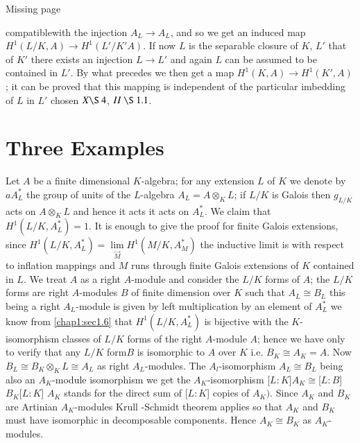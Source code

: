 \vfill

\centerline{\LARGE Missing page}\pageoriginale

\vfill


\noindent
compatible\pageoriginale with the injection $A_{L}
\rightarrow A_{L}$, and so we get an induced map $H^1 (L/K,A)
\rightarrow H^1 
(L'/K'A)$. If now $L$ is the separable closure of $K$, $L'$ that of $K'$
there  exists an  injection $L \rightarrow L'$ and again $L$ can be
assumed to be contained in $L'$. By what precedes we then get a map
$H^1 (K,A) \rightarrow H^1 (K', A)$; it can be proved that this mapping
is independent of the particular imbedding of $L$ in $L'$ chosen
\cite{keyS1} $X \S ~ 4$, \cite{keyS2} $ II  ~\S ~ 1.1$. 


\section{Three Examples}\label{chap1:sec1.7}

\begin{exam}\label{chap1:exam1}%
Let $A$ be a finite dimensional $K$-algebra; for any extension $L$ of
$K$ we denote by $ aA^{*}_{L}$ the group of units of the $L$-algebra
$A_L = A \otimes_{K} L$; if $L/K$ is Galois then $g_{L/K}$ acts on $A
\otimes_{K}L$ and hence it acts it acts on $A_{L}^{*}$. We claim that
$H^1 (L/K,A^{*}_{L}) = 1$. It is enough to give the proof for finite
Galois extensions, since $H^1 (L/K, A^{*}_{L}) =\lim
\limits_{\overset{\rightarrow}{M}} H^1 (M/K, A^{*}_{M})$ the inductive
limit is with respect to  inflation mappings and $M$ runs through
finite Galois  extensions of $K$ contained  in $L$. We treat  $A$ as a
right $A$-module  and consider the $L/K$ forms of $A$; the $L/K$ forms
are right $A$-modules  $B$ of finite dimension over $K$ such that
$A_{L} \cong B_{L} $ this being a right $A_{L}$-module is given by
left multiplication by an element of $A^{*}_{L}$ we know from \ref{chap1:sec1.6}
that $H^1 (L/K, A^{*}_{L})$ is bijective with the $K$-isomorphism
classes of $L/K$ forms  of the right $A$-module  $A$; hence we have
only to verify that any $L/K$ form\pageoriginale $B$ is isomorphic to
$A$ over $K$ 
i.e. $B_{K} \cong A_{K} =A$. Now  $B_{L} \cong B_{K} \otimes_{K} L
\cong A_{L}$ as right $A_{L}$-modules. The $A_{l}$-isomorphism $A_{L}
\cong B_{L}$ being also an $A_{K}$-module isomorphism we get the
$A_{K}$-isomorphism [$L:K$]$A_{K} \cong$[$L:B$]$B_{K}$[$L:K$] $A_{K}$
stands for the direct sum of [$L:K$] copies of $A_{K})$. Since
$A_{K}$ and $B_K$ are  Artinian $A_{K}$-modules Krull -Schmidt
theorem applies so that $A_{K}$ and $B_{K}$ must have isomorphic
in decomposable components. Hence $A_{K} \cong B_{K}$ as
$A_{K}$-modules. 
\end{exam}

